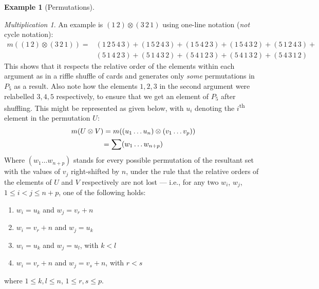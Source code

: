 \documentclass{article}
\theoremstyle{definition}
\newtheorem{Example}{Example}
\theoremstyle{remark}
\theoremstyle{underline}
\newtheorem*{Multiplication*}{Multiplication}
\theoremstyle{underline}
\renewcommand{\th}{\textsuperscript{th}\xspace}
\begin{document}
\begin{Example}[Permutations]
		\begin{Multiplication*}
			An example is $(1 \, 2) \otimes (3 \, 2 \,1)$ using one-line notation (\emph{not} cycle notation):
			\begin{align*}
			m((1 \, 2) \otimes (3 \, 2 \, 1)) = & (1 \, 2 \, 5 \, 4 \, 3) + (1 \, 5 \, 2 \, 4 \, 3) + (1 \, 5 \, 4 \, 2 \, 3) + (1 \, 5 \, 4 \, 3 \, 2) + (5 \, 1 \, 2 \, 4 \, 3) + {}\\
				& (5 \, 1 \, 4 \, 2 \, 3) +  (5 \, 1 \, 4 \, 3 \, 2) + (5 \, 4 \, 1 \, 2 \, 3) + (5 \, 4 \, 1 \, 3 \, 2) + (5 \, 4 \, 3 \, 1 \, 2)
			\end{align*}
			This shows that it respects the relative order of the elements within each argument as in a riffle shuffle of cards and generates only \emph{some} permutations in $P_5$ as a result. Also note how the elements $1, 2, 3$ in the second argument were relabelled $3, 4, 5$ respectively, to ensure that we get an element of $P_5$ after shuffling. This might be represented as given below, with $u_i$ denoting the $i$\th element in the permutation $U$:
			\begin{gather*}
			m\pqty{U \otimes V} = m\pqty{\pqty{u_1\ldots u_n} \otimes \pqty{v_1\ldots v_p}} \\
			= \sum (w_1 \ldots w_{n + p})
			\end{gather*}
			Where $(w_1 \ldots w_{n + p})$ stands for every possible permutation of the resultant set with the values of $v_j$ right-shifted by $n$, under the rule that the relative orders of the elements of $U$ and $V$ respectively are not lost --- i.e., for any two $w_i$, $w_j$, $1 \le i < j \le n + p$, one of the following holds:
			\begin{enumerate}
				\item $w_i = u_k$ and $w_j = v_r + n$ 
				\item $w_i = v_r + n$ and $w_j = u_k$
				\item $w_i = u_k$ and $w_j = u_l$, with $k < l$
				\item $w_i = v_r + n$ and $w_j = v_s + n$, with $r < s$
			\end{enumerate}
			where $1 \le k, l \le n$, $1 \le r, s \le p$.
		\end{Multiplication*}
		

\end{Example}
\end{document}
